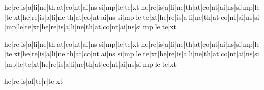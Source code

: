 he|re|is|a|li|ne|th|at|co|nt|ai|ns|si|mp|le|te|xt|he|re|is|a|li|ne|th|at|co|nt|ai|ns|si|mp|le|te|xt|he|re|is|a|li|ne|th|at|co|nt|ai|ns|si|mp|le|te|xt|he|re|is|a|li|ne|th|at|co|nt|ai|ns|si|mp|le|te|xt|he|re|is|a|li|ne|th|at|co|nt|ai|ns|si|mp|le|te|xt

he|re|is|a|li|ne|th|at|co|nt|ai|ns|si|mp|le|te|xt|he|re|is|a|li|ne|th|at|co|nt|ai|ns|si|mp|le|te|xt|he|re|is|a|li|ne|th|at|co|nt|ai|ns|si|mp|le|te|xt|he|re|is|a|li|ne|th|at|co|nt|ai|ns|si|mp|le|te|xt|he|re|is|a|li|ne|th|at|co|nt|ai|ns|si|mp|le|te|xt

he|re|is|af|te|r|te|xt %
